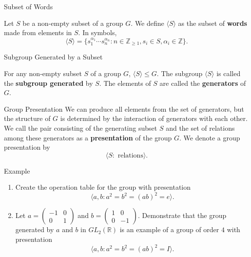\documentclass{beamer}
\begin{document}
\begin{frame}{Subset of Words}
\begin{definition}
\justifying
Let $S$ be a non-empty subset of a group $G$. We define $\langle S\rangle$ as the subset of \textbf{words} made from elements in $S$. In symbols,
\[
\langle S\rangle = \{s_1^{\alpha_1}\cdots s_n^{\alpha_n} : n \in \mathbb{Z}_{\geq 1}, s_i \in S, \alpha_i \in \mathbb{Z}\}.
\]
\end{definition}
\end{frame}

\begin{frame}{Subgroup Generated by a Subset}
\justifying
\begin{theorem}
\justifying
For any non-empty subset $S$ of a group $G$, $\langle S\rangle \leq G$. The subgroup $\langle S\rangle$ is called the \textbf{subgroup generated} by $S$. The elements of $S$ are called the \textbf{generators} of $G$.
\end{theorem}
\end{frame}

\begin{frame}{Group Presentation}
\justifying
We can produce all elements from the set of generators, but the structure of $G$ is determined by the interaction of generators with each other. We call the pair consisting of the generating subset $S$ and the set of relations among these generators as a \textbf{presentation} of the group $G$. We denote a group presentation by
\[
\langle S : \text{ relations}\rangle.
\]

\end{frame}

\begin{frame}{Example}

\begin{enumerate}
\item Create the operation table for the group with presentation
\[
\langle a, b : a^2 = b^2 = (ab)^2 = e\rangle.
\]
\item Let $a = \begin{pmatrix}-1 & 0 \\ 0 & 1\end{pmatrix}$ and $b = \begin{pmatrix}1 & 0 \\ 0 & -1\end{pmatrix}$. Demonstrate that the group generated by $a$ and $b$ in $GL_2(\mathbb{R})$ is an example of a group of order $4$ with presentation
\[
\langle a, b : a^2 = b^2 = (ab)^2 = I\rangle.
\]
\end{enumerate}

\end{frame}
\end{document}
